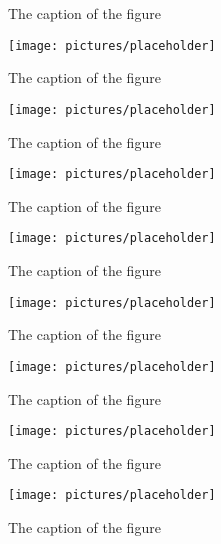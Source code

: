 \documentclass[12pt, oneside]{report}
\begin{document}
\begin{figure}[h]
  \centering
  \caption{The caption of the figure}
  \label{fig:BlockDiagram3}
\end{figure}

\begin{figure}[h]
  \centering
  \texttt{[image: pictures/placeholder]}
  \caption{The caption of the figure}
  \label{fig:BlockDiagram4}
\end{figure}

\begin{figure}[h]
  \centering
  \texttt{[image: pictures/placeholder]}
  \caption{The caption of the figure}
  \label{fig:BlockDiagram4}
\end{figure}

\begin{figure}[h]
  \centering
  \texttt{[image: pictures/placeholder]}
  \caption{The caption of the figure}
  \label{fig:BlockDiagram4}
\end{figure}

\begin{figure}[h]
  \centering
  \texttt{[image: pictures/placeholder]}
  \caption{The caption of the figure}
  \label{fig:BlockDiagram4}
\end{figure}

\begin{figure}[h]
  \centering
  \texttt{[image: pictures/placeholder]}
  \caption{The caption of the figure}
  \label{fig:BlockDiagram4}
\end{figure}

\begin{figure}[h]
  \centering
  \texttt{[image: pictures/placeholder]}
  \caption{The caption of the figure}
  \label{fig:BlockDiagram4}
\end{figure}

\begin{figure}[h]
  \centering
  \texttt{[image: pictures/placeholder]}
  \caption{The caption of the figure}
  \label{fig:BlockDiagram4}
\end{figure}

\begin{figure}[h]
  \centering
  \texttt{[image: pictures/placeholder]}
  \caption{The caption of the figure}
  \label{fig:BlockDiagram4}
\end{figure}
\end{document}
